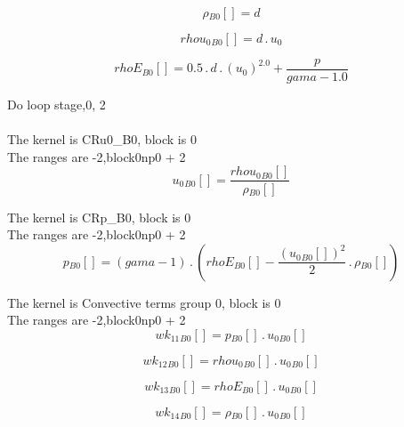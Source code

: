 \documentclass{article}
\begin{document}
\begin{dmath}{\rho{_{B0}}}[{}] = d\end{dmath}

\begin{dmath}{rhou_{0}{_{B0}}}[{}] = d \,.\, u_{0}\end{dmath}

\begin{dmath}{rhoE{_{B0}}}[{}] = 0.5 \,.\, d \,.\, \left(u_{0} \right)^{2.0} + \frac{p}{gama - 1.0}\end{dmath}

\noindent Do loop stage,0, 2\\
\\\noindent The kernel is CRu0_B0, block is 0\\\noindent The ranges are -2,block0np0 + 2\\\begin{dmath}{u_{0}{_{B0}}}[{}] = \frac{{rhou_{0}{_{B0}}}[{}]}{{\rho{_{B0}}}[{}]}\end{dmath}

\noindent The kernel is CRp_B0, block is 0\\\noindent The ranges are -2,block0np0 + 2\\\begin{dmath}{p{_{B0}}}[{}] = \left(gama - 1\right) \,.\, \left({rhoE{_{B0}}}[{}] - \frac{\left({u_{0}{_{B0}}}[{}] \right)^{2}}{2} \,.\, {\rho{_{B0}}}[{}]\right)\end{dmath}

\noindent The kernel is Convective terms group 0, block is 0\\\noindent The ranges are -2,block0np0 + 2\\\begin{dmath}{wk_{11}{_{B0}}}[{}] = {p{_{B0}}}[{}] \,.\, {u_{0}{_{B0}}}[{}]\end{dmath}

\begin{dmath}{wk_{12}{_{B0}}}[{}] = {rhou_{0}{_{B0}}}[{}] \,.\, {u_{0}{_{B0}}}[{}]\end{dmath}

\begin{dmath}{wk_{13}{_{B0}}}[{}] = {rhoE{_{B0}}}[{}] \,.\, {u_{0}{_{B0}}}[{}]\end{dmath}

\begin{dmath}{wk_{14}{_{B0}}}[{}] = {\rho{_{B0}}}[{}] \,.\, {u_{0}{_{B0}}}[{}]\end{dmath}
\end{document}
